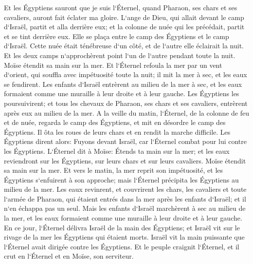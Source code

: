\verse Et les Égyptiens sauront que je suis l`Éternel, quand Pharaon, ses chars et ses cavaliers, auront fait éclater ma gloire. 
\verse L`ange de Dieu, qui allait devant le camp d`Israël, partit et alla derrière eux; et la colonne de nuée qui les précédait, partit et se tint derrière eux. 
\verse Elle se plaça entre le camp des Égyptiens et le camp d`Israël. Cette nuée était ténébreuse d`un côté, et de l`autre elle éclairait la nuit. Et les deux camps n`approchèrent point l`un de l`autre pendant toute la nuit. 
\verse Moïse étendit sa main sur la mer. Et l`Éternel refoula la mer par un vent d`orient, qui souffla avec impétuosité toute la nuit; il mit la mer à sec, et les eaux se fendirent. 
\verse Les enfants d`Israël entrèrent au milieu de la mer à sec, et les eaux formaient comme une muraille à leur droite et à leur gauche. 
\verse Les Égyptiens les poursuivirent; et tous les chevaux de Pharaon, ses chars et ses cavaliers, entrèrent après eux au milieu de la mer. 
\verse A la veille du matin, l`Éternel, de la colonne de feu et de nuée, regarda le camp des Égyptiens, et mit en désordre le camp des Égyptiens. 
\verse Il ôta les roues de leurs chars et en rendit la marche difficile. Les Égyptiens dirent alors: Fuyons devant Israël, car l`Éternel combat pour lui contre les Égyptiens. 
\verse L`Éternel dit à Moïse: Étends ta main sur la mer; et les eaux reviendront sur les Égyptiens, sur leurs chars et sur leurs cavaliers. 
\verse Moïse étendit sa main sur la mer. Et vers le matin, la mer reprit son impétuosité, et les Égyptiens s`enfuirent à son approche; mais l`Éternel précipita les Égyptiens au milieu de la mer. 
\verse Les eaux revinrent, et couvrirent les chars, les cavaliers et toute l`armée de Pharaon, qui étaient entrés dans la mer après les enfants d`Israël; et il n`en échappa pas un seul. 
\verse Mais les enfants d`Israël marchèrent à sec au milieu de la mer, et les eaux formaient comme une muraille à leur droite et à leur gauche. 
\verse En ce jour, l`Éternel délivra Israël de la main des Égyptiens; et Israël vit sur le rivage de la mer les Égyptiens qui étaient morts. 
\verse Israël vit la main puissante que l`Éternel avait dirigée contre les Égyptiens. Et le peuple craignit l`Éternel, et il crut en l`Éternel et en Moïse, son serviteur. 


